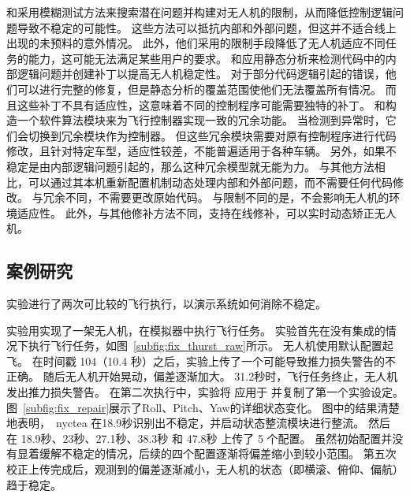 

和采用模糊测试方法来搜索潜在问题并构建对无人机的限制，从而降低控制逻辑问题导致不稳定的可能性。
这些方法可以抵抗内部和外部问题，但这并不适合线上出现的未预料的意外情况。
此外，他们采用的限制手段降低了无人机适应不同任务的能力，这可能无法满足某些用户的要求。
和应用静态分析来检测代码中的内部逻辑问题并创建补丁以提高无人机稳定性。
对于部分代码逻辑引起的错误，他们可以进行完整的修复，但是静态分析的覆盖范围使他们无法覆盖所有情况。
而且这些补丁不具有适应性，这意味着不同的控制程序可能需要独特的补丁。
和构造一个软件算法模块来为飞行控制器实现一致的冗余功能。
当检测到异常时，它们会切换到冗余模块作为控制器。
但这些冗余模块需要对原有控制程序进行代码修改，且针对特定车型，适应性较差，不能普遍适用于各种车辆。
另外，如果不稳定是由内部逻辑问题引起的，那么这种冗余模型就无能为力。
与其他方法相比，\nyctea 可以通过其本机重新配置机制动态处理内部和外部问题，而不需要任何代码修改。 
与冗余不同，\nyctea 不需要更改原始代码。
与限制不同的是，\nyctea 不会影响无人机的环境适应性。 
此外，与其他修补方法不同，\nyctea 支持在线修补，可以实时动态矫正无人机。


\subsection{案例研究}
实验进行了两次可比较的飞行执行，以演示系统如何消除不稳定。

实验用实现了一架无人机，在模拟器中执行飞行任务。
实验首先在没有集成\nyctea 的情况下执行飞行任务，如图~\ref{subfig:fix_thurst_raw}所示。
无人机使用默认配置起飞。
在时间戳 104（10.4 秒）之后，实验上传了一个可能导致推力损失警告的不正确。
随后无人机开始晃动，偏差逐渐加大。
31.2秒时，飞行任务终止，无人机发出推力损失警告。
在第二次执行中，实验将 \nyctea 应用于 并复制了第一个实验设定。
图~\ref{subfig:fix_repair}展示了Roll、Pitch、Yaw的详细状态变化。
图中的结果清楚地表明，\ nyctea 在18.9秒识别出不稳定，并启动状态整流模块进行整流。
然后 \nyctea  在 18.9秒、23秒、27.1秒、38.3秒 和 47.8秒 上传了 5 个配置。
虽然初始配置并没有显着缓解不稳定的情况，后续的四个配置逐渐将偏差缩小到较小范围。
第五次校正上传完成后，观测到的偏差逐渐减小，无人机的状态（即横滚、俯仰、偏航）趋于稳定。
 

